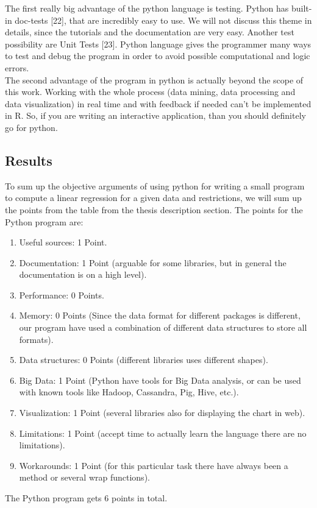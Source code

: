 \documentclass{article}
\begin{document}
The first really big advantage of the python language is testing. Python has built-in doc-tests [22], that are incredibly easy to use. We will not discuss this theme in details, since the tutorials and the documentation are very easy. Another test possibility are Unit Tests [23]. Python language gives the programmer many ways to test and debug the program in order to avoid possible computational and logic errors.\\
The second advantage of the program in python is actually beyond the scope of this work. Working with the whole process (data mining, data processing and data visualization) in real time and with feedback if needed can't be implemented in R. So, if you are writing an interactive application, than you should definitely go for python.

\subsection{Results}
To sum up the objective arguments of using python for writing a small program to compute a linear regression for a given data and restrictions, we will sum up the points from the table from the thesis description section.
The points for the Python program are:
\begin{enumerate}
    \item Useful sources: 1 Point.
    \item Documentation: 1 Point (arguable for some libraries, but in general the documentation is on a high level).
    \item Performance: 0 Points.
    \item Memory: 0 Points (Since the data format for different packages is different, our program have used a combination of different data structures to store all formats).
    \item Data structures: 0 Points (different libraries uses different shapes).
    \item Big Data: 1 Point (Python have tools for Big Data analysis, or can be used with known tools like Hadoop, Cassandra, Pig, Hive, etc.).
    \item Visualization: 1 Point (several libraries also for displaying the chart in web).
    \item Limitations: 1 Point (accept time to actually learn the language there are no limitations).
    \item Workarounds: 1 Point (for this particular task there have always been a method or several wrap functions).
\end{enumerate} 
The Python program gets 6 points in total.
\end{document}
